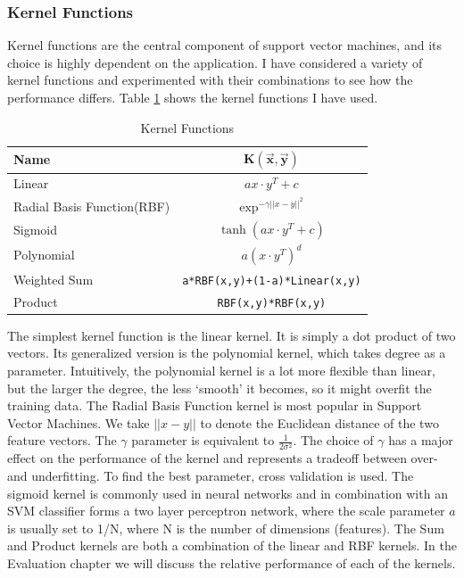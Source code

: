 \documentclass[11pt,twoside,notitlepage]{report}
\begin{document}
\subsubsection*{Kernel Functions}
Kernel functions are the central component of support vector machines, and its
choice is highly dependent on the application. I have considered a variety of
kernel functions and experimented with their combinations to see how the
performance differs. Table \ref{kfun} shows the kernel functions I have used.
\begin{table}[h]
\begin{center}
\begin{tabular}{|l|c|}
  \hline
  \textbf{Name} &\( \bm{K(\vec{x},\vec{y})}\)\\
  \hline\hline
  Linear  & \(ax\cdot y^T + c\)\\  
\hline
Radial Basis Function(RBF)  & \(\exp^{-\gamma ||x-y||^2}\)\\
\hline
Sigmoid   &   \(\tanh(ax \cdot y^T + c)\)\\
\hline
Polynomial& \(a(x\cdot y^T)^d\)  \\
\hline
Weighted Sum&  \texttt{a*RBF(x,y)+(1-a)*Linear(x,y)}\\
\hline
Product     & \texttt{RBF(x,y)*RBF(x,y)}\\
\hline
\end{tabular}
\end{center}
\caption{Kernel Functions \label{kfun}}
\end{table}
The simplest kernel function is the linear kernel. It is simply a dot product
of two vectors. Its generalized version is the polynomial kernel, which takes
degree as a parameter. Intuitively, the polynomial kernel is a lot more
flexible than linear, but the larger the degree, the less `smooth' it becomes,
so it might overfit the training data.  The Radial Basis Function kernel is
most popular in Support Vector Machines. We take \(||x-y||\) to denote the
Euclidean distance of the two feature vectors. The \(\gamma\) parameter is
equivalent to \(\frac{1}{2\sigma^2}\). The choice of \(\gamma\) has a major
effect on the performance of the kernel and represents a tradeoff between over-
and underfitting. To find the best parameter, cross validation is used.
 The sigmoid kernel is commonly used in neural networks
and in combination with an SVM classifier forms a two layer perceptron network,
where the scale parameter \(a\) is usually set to 1/N, where N is the number of
dimensions (features)\cite{sigmoid}. The Sum and Product kernels are both a
combination of the linear and RBF kernels. In the Evaluation chapter we will discuss
the relative performance of each of the kernels.
\end{document}
